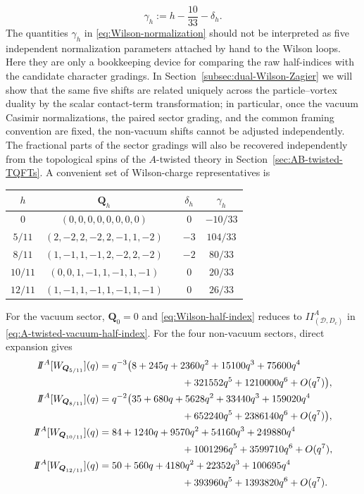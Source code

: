 \documentclass[11pt,a4paper]{article}
\numberwithin{equation}{section}
\begin{document}
\begin{equation}
  \gamma_h
  :=h-\frac{10}{33}-\delta_h.
  \label{eq:Wilson-normalization}
\end{equation}
The quantities $\gamma_h$ in \eqref{eq:Wilson-normalization} should not be interpreted as five independent normalization parameters attached by hand to the Wilson loops.  Here they are only a bookkeeping device for comparing the raw half-indices with the candidate character gradings.  In Section~\ref{subsec:dual-Wilson-Zagier} we will show that the same five shifts are related uniquely across the particle--vortex duality by the scalar contact-term transformation; in particular, once the vacuum Casimir normalizations, the paired sector grading, and the common framing convention are fixed, the non-vacuum shifts cannot be adjusted independently.  The fractional parts of the sector gradings will also be recovered independently from the topological spins of the $A$-twisted theory in Section~\ref{sec:AB-twisted-TQFTs}.
A convenient set of Wilson-charge representatives is
\begin{center}
\small
\begin{tabular}{cclcc}
\toprule
$h$ & $\boldsymbol Q_h$ & & $\delta_h$ & $\gamma_h$\\
\midrule
$0$ & $(0,0,0,0,0,0,0,0)$ && $0$ & $-10/33$\\
$5/11$ & $(2,-2,2,-2,2,-1,1,-2)$ && $-3$ & $104/33$\\
$8/11$ & $(1,-1,1,-1,2,-2,2,-2)$ && $-2$ & $80/33$\\
$10/11$ & $(0,0,1,-1,1,-1,1,-1)$ && $0$ & $20/33$\\
$12/11$ & $(1,-1,1,-1,1,-1,1,-1)$ && $0$ & $26/33$\\
\bottomrule
\end{tabular}
\end{center}
For the vacuum sector, $\boldsymbol Q_0=0$ and \eqref{eq:Wilson-half-index} reduces to $I\!\!I_{(\mathcal D,D_c)}^{A}$ in \eqref{eq:A-twisted-vacuum-half-index}.  For the four non-vacuum sectors, direct expansion gives
\begin{align}
I\!\!I^{A}[W_{\boldsymbol Q_{5/11}}](q)
={}&q^{-3}\bigl(8+245q+2360q^2+15100q^3+75600q^4\nonumber\\
&\hspace{25mm}{}+321552q^5+1210000q^6+O(q^7)\bigr),\nonumber\\
I\!\!I^{A}[W_{\boldsymbol Q_{8/11}}](q)
={}&q^{-2}\bigl(35+680q+5628q^2+33440q^3+159020q^4\nonumber\\
&\hspace{25mm}{}+652240q^5+2386140q^6+O(q^7)\bigr),\nonumber\\
I\!\!I^{A}[W_{\boldsymbol Q_{10/11}}](q)
={}&84+1240q+9570q^2+54160q^3+249880q^4\nonumber\\
&\hspace{25mm}{}+1001296q^5+3599710q^6+O(q^7),\nonumber\\
I\!\!I^{A}[W_{\boldsymbol Q_{12/11}}](q)
={}&50+560q+4180q^2+22352q^3+100695q^4\nonumber\\
&\hspace{25mm}{}+393960q^5+1393820q^6+O(q^7).
\label{eq:Wilson-series}
\end{align}
\end{document}
